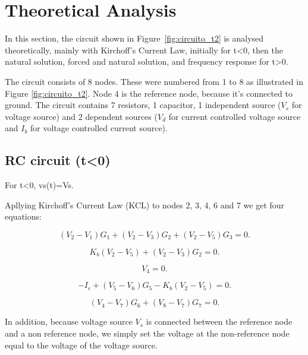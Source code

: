 \section{Theoretical Analysis}
\label{sec:analysis}

In this section, the circuit shown in Figure~\ref{fig:circuito_t2} is analysed
theoretically, mainly with Kirchoff's Current Law, initially for t<0, then the natural solution, forced and natural solution, and frequency response for t>0.

The circuit consists of 8 nodes. These were numbered from 1 to 8 as illustrated in Figure \ref{fig:circuito_t2}. Node 4 is the reference node, because it's connected to ground. The circuit contains 7 resistors, 1 capacitor, 1 independent source ($V_s$ for voltage source) and 2 dependent sources ($V_d$ for current controlled voltage source and $I_b$ for voltage controlled current source).


\subsection{RC circuit (t<0)}

For t<0, vs(t)=Vs.


Apllying Kirchoff's Current Law (KCL) to nodes 2, 3, 4, 6 and 7 we get four equations:

\begin{equation}
  (V_2-V_1)G_1+(V_2-V_3)G_2+(V_2-V_5)G_3=0.
  \label{eq:n2}
\end{equation}

\begin{equation}
  K_b(V_2-V_5)+(V_2-V_3)G_2=0.
  \label{eq:n3}
\end{equation}

\begin{equation}
  V_4=0.
  \label{eq:n4}
\end{equation}

\begin{equation}
  -I_c+(V_5-V_6)G_5-K_b(V_2-V_5)=0.
  \label{eq:n6}
\end{equation}

\begin{equation}
  (V_4-V_7)G_6+(V_8-V_7)G_7=0.
  \label{eq:n7}
\end{equation}

In addition, because voltage source $V_s$ is connected between the reference node and a non reference node, we simply set the voltage at the non-reference node equal to the voltage of the voltage source.

